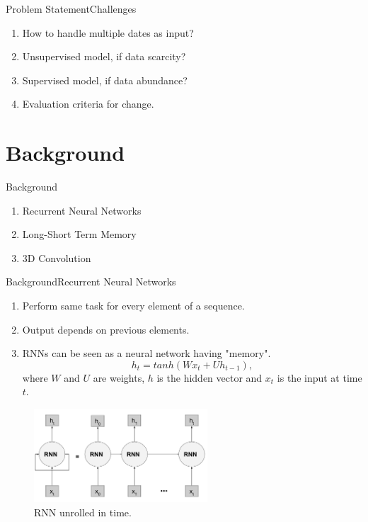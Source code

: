 \documentclass[handout]{beamer}
\begin{document}
\begin{frame}{Problem Statement}{Challenges}
  \begin{enumerate}
    \item How to handle multiple dates as input?
    \item Unsupervised model, if data scarcity?
    \item Supervised model, if data abundance?
    \item Evaluation criteria for change.
  \end{enumerate}
\end{frame}

\section{Background}
\begin{frame}{Background}
  \begin{enumerate}
    \item Recurrent Neural Networks
    \item Long-Short Term Memory
    \item 3D Convolution
  \end{enumerate}
\end{frame}

\begin{frame}{Background}{Recurrent Neural Networks}
  \begin{enumerate}
    \item Perform same task for every element of a sequence.
    \item Output depends on previous elements.
    \item RNNs can be seen as a neural network having "memory".
    \begin{equation}
        h_t = tanh(Wx_t+Uh_{t-1}),
    \end{equation}
    where $W$ and $U$ are weights, $h$ is the hidden vector and $x_t$ is the input at time $t$.
  \end{enumerate}
  \begin{center}
    \begin{figure}
    \includegraphics[width=0.6\linewidth, height=3.5cm]{images/RNN}
    \caption{RNN unrolled in time.}
    \end{figure}
  \end{center}
\end{frame}
\end{document}
